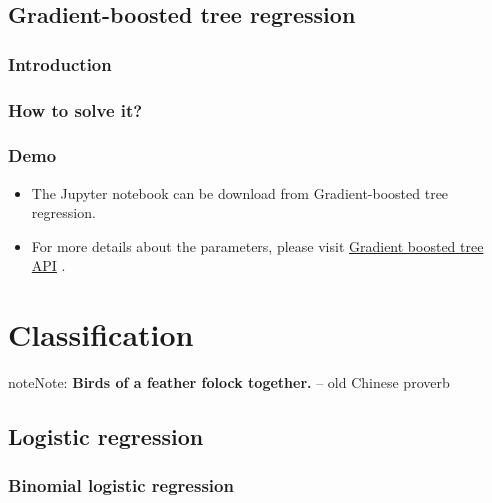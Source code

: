 \documentclass[letterpaper,11pt,english]{sphinxmanual}
\begin{document}
\section{Gradient-boosted tree regression}
\label{regression:gradient-boosted-tree-regression}

\subsection{Introduction}
\label{regression:id15}

\subsection{How to solve it?}
\label{regression:id16}

\subsection{Demo}
\label{regression:id17}\begin{itemize}
\item {} 
The Jupyter notebook can be download from Gradient-boosted tree regression.

\item {} 
For more details about the parameters, please visit \href{http://takwatanabe.me/pyspark/generated/generated/ml.regression.GBTRegressor.html}{Gradient boosted tree API} .

\end{itemize}


\chapter{Classification}
\label{classification:gradient-boosted-tree-api}\label{classification::doc}\label{classification:classification}\label{classification:id1}
\begin{notice}{note}{Note:}
\textbf{Birds of a feather folock together.} -- old Chinese proverb
\end{notice}


\section{Logistic regression}
\label{classification:logistic-regression}

\subsection{Binomial logistic regression}
\label{classification:binomial-logistic-regression}
\end{document}
